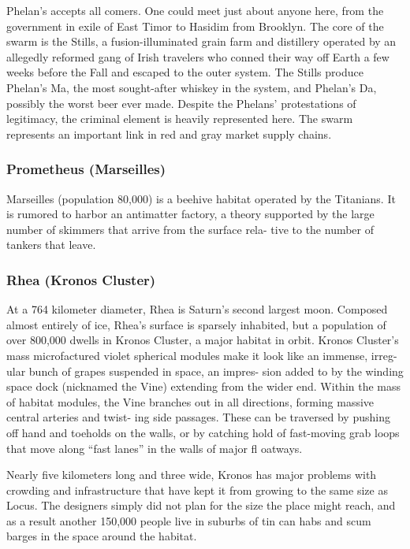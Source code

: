 Phelan's accepts all comers. One could meet just 
about anyone here, from the government in exile of 
East Timor to Hasidim from Brooklyn. The core of 
the swarm is the Stills, a fusion-illuminated grain 
farm and distillery operated by an allegedly reformed 
gang of Irish travelers who conned their way off 
Earth a few weeks before the Fall and escaped to 
the outer system. The Stills produce Phelan's Ma, the 
most sought-after whiskey in the system, and Phelan's 
Da, possibly the worst beer ever made. Despite the 
Phelans' protestations of legitimacy, the criminal 
element is heavily represented here. The swarm 
represents an important link in red and gray market 
supply chains.

\subsubsection{Prometheus (Marseilles)}

Marseilles (population 80,000) is a beehive habitat 
operated by the Titanians. It is rumored to harbor an 
antimatter factory, a theory supported by the large 
number of skimmers that arrive from the surface rela-
tive to the number of tankers that leave.

\subsubsection{Rhea (Kronos Cluster)}

At a 764 kilometer diameter, Rhea is Saturn's second 
largest moon. Composed almost entirely of ice, Rhea's 
surface is sparsely inhabited, but a population of over 
800,000 dwells in Kronos Cluster, a major habitat 
in orbit. Kronos Cluster's mass microfactured violet 
spherical modules make it look like an immense, irreg-
ular bunch of grapes suspended in space, an impres-
sion added to by the winding space dock (nicknamed 
the Vine) extending from the wider end. Within the 
mass of habitat modules, the Vine branches out in all 
directions, forming massive central arteries and twist-
ing side passages. These can be traversed by pushing 
off hand and toeholds on the walls, or by catching 
hold of fast-moving grab loops that move along ``fast 
lanes'' in the walls of major fl oatways.

Nearly five kilometers long and three wide, Kronos 
has major problems with crowding and infrastructure 
that have kept it from growing to the same size as 
Locus. The designers simply did not plan for the size 
the place might reach, and as a result another 150,000 
people live in suburbs of tin can habs and scum barges 
in the space around the habitat. 

